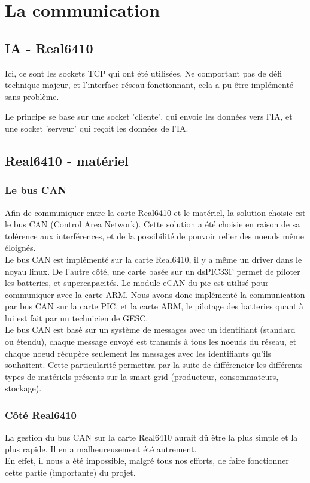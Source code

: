 \documentclass[a4,french,12pt]{article}
\begin{document}
\newpage
\section{La communication}
\subsection{IA - Real6410}

Ici, ce sont les sockets TCP qui ont été utilisées. Ne comportant pas de défi technique majeur, et l'interface réseau fonctionnant, cela a pu être implémenté sans problème.

Le principe se base sur une socket 'cliente', qui envoie les données vers l'IA, et une socket 'serveur' qui reçoit les données de l'IA.




\subsection{Real6410 - matériel}
\subsubsection{Le bus CAN}
Afin de communiquer entre la carte Real6410 et le matériel, la solution choisie est le bus CAN (Control Area Network). Cette 
solution a été choisie en raison de sa tolérence aux interférences, et de la possibilité de pouvoir relier des noeuds même 
éloignés. \\
Le bus CAN est implémenté sur la carte Real6410, il y a même un driver dans le noyau linux. De l'autre côté, une carte 
basée sur un dsPIC33F permet de piloter les batteries, et supercapacités. Le module eCAN du pic est utilisé pour 
communiquer avec la carte ARM. Nous avons donc implémenté la communication par bus CAN sur la carte PIC, et la carte ARM, 
le pilotage des batteries quant à lui est fait par un technicien de GESC. \\
Le bus CAN est basé sur un système de messages avec un identifiant (standard ou étendu), chaque message envoyé est transmis 
à tous les noeuds du réseau, et chaque noeud récupère seulement les messages avec les identifiants qu'ils souhaitent. Cette 
particularité permettra par la suite de différencier les différents types de matériels présents sur la smart grid 
(producteur, consommateurs, stockage).


\subsubsection{Côté Real6410}
La gestion du bus CAN sur la carte Real6410 aurait dû être la plus simple et la plus rapide. Il en a malheureusement été autrement.\\
En effet, il nous a été impossible, malgré tous nos efforts, de faire fonctionner cette partie (importante) du projet.
\end{document}
